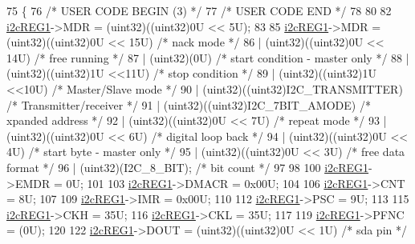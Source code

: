 \begin{DoxyCode}
75 \{
76 \textcolor{comment}{/* USER CODE BEGIN (3) */}
77 \textcolor{comment}{/* USER CODE END */}
78 
80 
82     \mbox{\hyperlink{reg__i2c_8h_a54937525fe89322407ede2bc3a5d0e4c}{i2cREG1}}->MDR = (uint32)((uint32)0U << 5U);
83 
85     \mbox{\hyperlink{reg__i2c_8h_a54937525fe89322407ede2bc3a5d0e4c}{i2cREG1}}->MDR =   (uint32)((uint32)0U << 15U)     \textcolor{comment}{/* nack mode                         */}
86                    | (uint32)((uint32)0U << 14U)     \textcolor{comment}{/* free running                      */}
87                    | (uint32)(0U)              \textcolor{comment}{/* start condition - master only     */}
88                    | (uint32)((uint32)1U <<11U)      \textcolor{comment}{/* stop condition                    */}
89                    | (uint32)((uint32)1U <<10U)      \textcolor{comment}{/* Master/Slave mode                 */}
90                    | (uint32)((uint32)I2C\_TRANSMITTER)     \textcolor{comment}{/* Transmitter/receiver              */}
91                    | (uint32)((uint32)I2C\_7BIT\_AMODE)      \textcolor{comment}{/* xpanded address                   */}
92                    | (uint32)((uint32)0U << 7U)      \textcolor{comment}{/* repeat mode                       */}
93                    | (uint32)((uint32)0U << 6U)     \textcolor{comment}{/* digital loop back                  */}
94                    | (uint32)((uint32)0U << 4U)     \textcolor{comment}{/* start byte - master only          */}
95                    | (uint32)((uint32)0U << 3U)           \textcolor{comment}{/* free data format                  */}
96                    | (uint32)(I2C\_8\_BIT);   \textcolor{comment}{/* bit count                         */}
97 
98 
100     \mbox{\hyperlink{reg__i2c_8h_a54937525fe89322407ede2bc3a5d0e4c}{i2cREG1}}->EMDR = 0U;
101 
103     \mbox{\hyperlink{reg__i2c_8h_a54937525fe89322407ede2bc3a5d0e4c}{i2cREG1}}->DMACR = 0x00U;
104 
106     \mbox{\hyperlink{reg__i2c_8h_a54937525fe89322407ede2bc3a5d0e4c}{i2cREG1}}->CNT = 8U;
107 
109     \mbox{\hyperlink{reg__i2c_8h_a54937525fe89322407ede2bc3a5d0e4c}{i2cREG1}}->IMR = 0x00U;
110 
112     \mbox{\hyperlink{reg__i2c_8h_a54937525fe89322407ede2bc3a5d0e4c}{i2cREG1}}->PSC = 9U;
113 
115     \mbox{\hyperlink{reg__i2c_8h_a54937525fe89322407ede2bc3a5d0e4c}{i2cREG1}}->CKH = 35U;
116     \mbox{\hyperlink{reg__i2c_8h_a54937525fe89322407ede2bc3a5d0e4c}{i2cREG1}}->CKL = 35U;
117 
119     \mbox{\hyperlink{reg__i2c_8h_a54937525fe89322407ede2bc3a5d0e4c}{i2cREG1}}->PFNC = (0U);
120 
122     \mbox{\hyperlink{reg__i2c_8h_a54937525fe89322407ede2bc3a5d0e4c}{i2cREG1}}->DOUT = (uint32)((uint32)0U << 1U)     \textcolor{comment}{/* sda pin */}

\end{DoxyCode}
